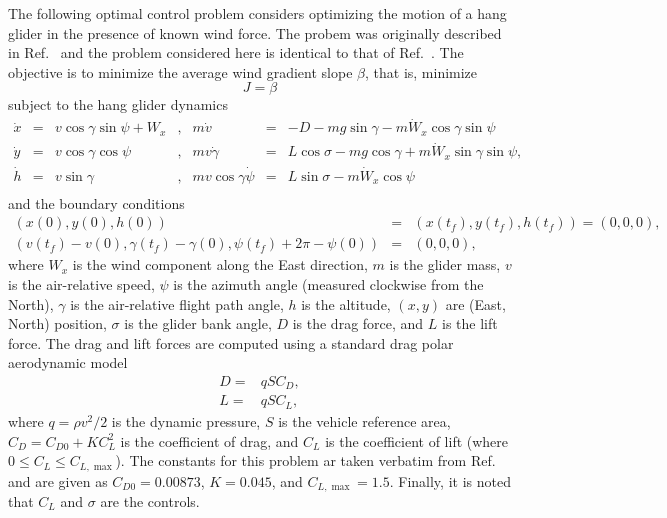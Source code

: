 \documentclass[10pt]{article}
\begin{document}
The following optimal control problem considers optimizing the motion
of a hang glider in the presence of known wind force.  The probem was
originally described in Ref.~\cite{Zhao2} and the problem considered
here is identical to that of Ref.~\cite{Zhao2}.  The objective is to
minimize the average wind gradient slope $\beta$, that is, minimize
\begin{equation}
  J = \beta
\end{equation}
subject to the hang glider dynamics
\begin{equation}
  \begin{array}{lclclcl}
     \dot{x}& =& v \cos \gamma \sin \psi + W_x &,&
     m\dot{v}& =& -D-mg \sin\gamma -m\dot{W}_x \cos \gamma \sin \psi \\
     \dot{y}& =& v \cos \gamma \cos \psi &,&
     mv\dot{\gamma}& =& L \cos \sigma -mg \cos \gamma + m\dot{W}_x \sin\gamma \sin \psi, \\
     \dot{h}& =& v \sin \gamma &,&
     mv\cos\gamma\dot{\psi}& =& L \sin \sigma -m \dot{W}_x \cos \psi \\
  \end{array}
\end{equation}
and the boundary conditions
\begin{equation}\label{orbit_bcs}
 \begin{array}{lcl}
   (x(0),y(0),h(0))& =& (x(t_f),y(t_f),h(t_f)) = (0,0,0), \\
   (v(t_f)-v(0),\gamma(t_f)-\gamma(0),\psi(t_f)+2\pi-\psi(0)) &= &(0,0,0),
 \end{array}
\end{equation} 
where $W_x$ is the wind  component along the East direction, $m$ is
the glider mass, $v$ is the air-relative speed, $\psi$ is the azimuth
angle  (measured clockwise from the North), $\gamma$ is the
air-relative flight path angle, $h$ is the altitude, $(x,y)$ are (East, North)
position,  $\sigma$ is the glider bank angle, $D$ is the drag force,
and $L$ is the lift force.  The drag and lift forces are computed
using a standard drag polar aerodynamic model
\begin{equation}
 \begin{array}{lcl}
   D = & q S C_D, \\
   L = & q S C_L,
 \end{array}
\end{equation} 
where $q=\rho v^2/2$ is the dynamic pressure, $S$ is the vehicle
reference area, $C_D=C_{D0}+KC_L^2$ is the coefficient of drag, and 
$C_L$ is the coefficient of lift (where $0 \leq C_L \leq C_{L,\max}$).
The constants for this problem ar taken verbatim from
Ref.~ and are given as $C_{D0}=0.00873$, $K=0.045$, and
$C_{L,\max}=1.5$. Finally, it is noted that $C_L$ and $\sigma$ are the
controls.
\end{document}
